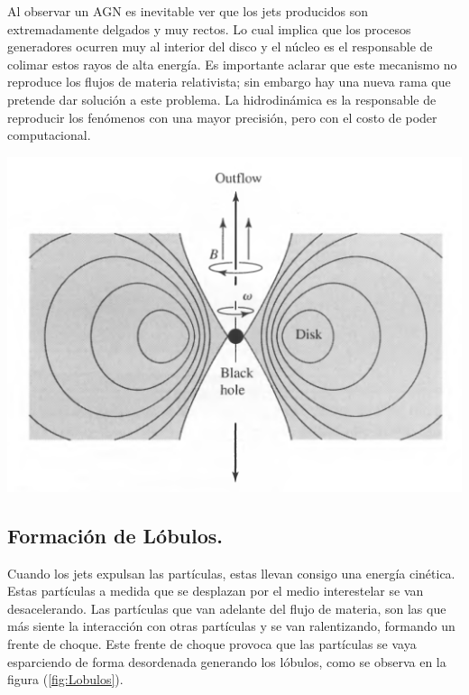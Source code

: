 Al observar un AGN es inevitable ver que los jets producidos son extremadamente delgados y muy rectos. Lo cual implica  que los procesos generadores ocurren muy al interior del disco y el núcleo es el responsable de colimar estos rayos de alta energía. Es importante aclarar que este mecanismo no reproduce los flujos de materia relativista; sin embargo hay una nueva rama que pretende dar solución a este problema. La hidrodinámica es la responsable de reproducir los fenómenos con una mayor precisión, pero con el costo de poder computacional.

\includegraphics[scale=.4]{./figures/3_AGNs/Jets.png}
\label{fig:Modelo_interior_AGN}


	\subsection{Formación de Lóbulos.}
	\label{subsec:Formation_lobules}

Cuando los jets expulsan las partículas, estas llevan consigo una energía cinética. Estas partículas a medida que se desplazan por el medio interestelar se van desacelerando. Las partículas que van adelante del flujo de materia, son las que más siente la interacción con otras partículas y se van ralentizando, formando un frente de choque. Este frente de choque provoca que las partículas se vaya esparciendo  de forma desordenada generando los lóbulos, como se observa en la figura (\ref{fig:Lobulos}).

